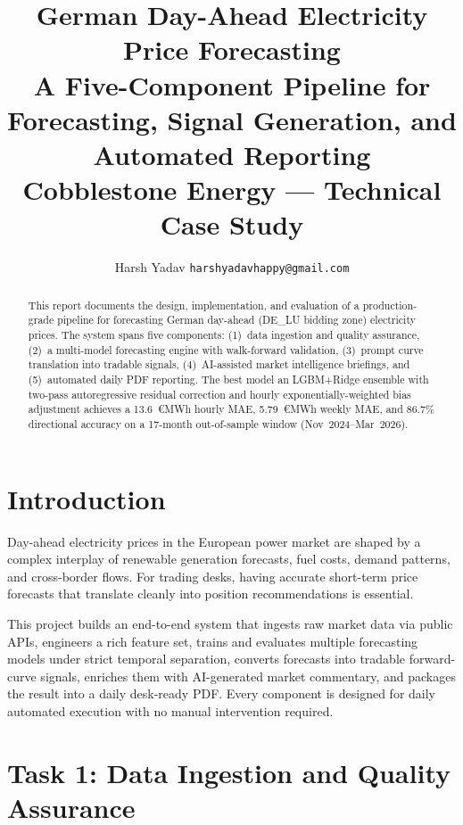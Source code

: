 \documentclass[11pt,a4paper]{article}
\title{%
  \vspace{-1.5cm}
  \textbf{German Day-Ahead Electricity Price Forecasting}\\[0.3em]
  \large A Five-Component Pipeline for Forecasting, Signal Generation, and Automated Reporting\\[0.5em]
  \normalsize Cobblestone Energy --- Technical Case Study
}
\author{Harsh Yadav \quad \small\texttt{harshyadavhappy@gmail.com}}
\date{}
\begin{document}
\maketitle
\thispagestyle{fancy}

\vspace{-0.5cm}
\begin{abstract}
This report documents the design, implementation, and evaluation of a production-grade pipeline for forecasting German day-ahead (DE\_LU bidding zone) electricity prices. The system spans five components: (1)~data ingestion and quality assurance, (2)~a multi-model forecasting engine with walk-forward validation, (3)~prompt curve translation into tradable signals, (4)~AI-assisted market intelligence briefings, and (5)~automated daily PDF reporting. The best model an LGBM+Ridge ensemble with two-pass autoregressive residual correction and hourly exponentially-weighted bias adjustment achieves a 13.6~\euro MWh hourly MAE, 5.79~\euro MWh weekly MAE, and 86.7\% directional accuracy on a 17-month out-of-sample window (Nov~2024--Mar~2026).
\end{abstract}

\section{Introduction}
\label{sec:intro}

Day-ahead electricity prices in the European power market are shaped by a complex interplay of renewable generation forecasts, fuel costs, demand patterns, and cross-border flows. For trading desks, having accurate short-term price forecasts that translate cleanly into position recommendations is essential.

This project builds an end-to-end system that ingests raw market data via public APIs, engineers a rich feature set, trains and evaluates multiple forecasting models under strict temporal separation, converts forecasts into tradable forward-curve signals, enriches them with AI-generated market commentary, and packages the result into a daily desk-ready PDF. Every component is designed for daily automated execution with no manual intervention required.

\section{Task 1: Data Ingestion and Quality Assurance}
\label{sec:task1}
\end{document}
